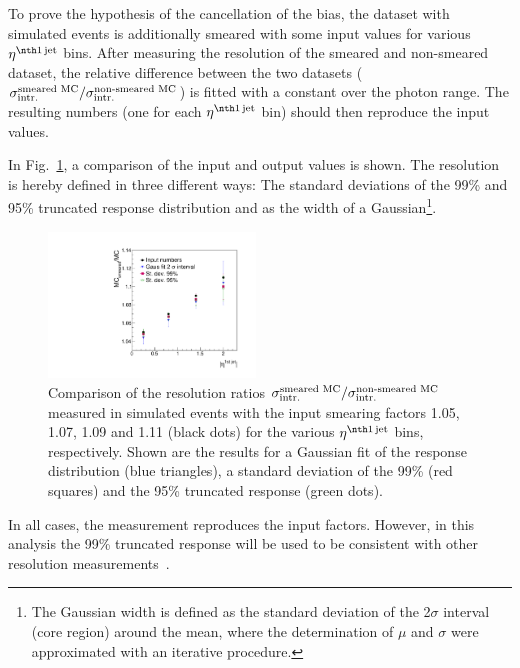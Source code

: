 
To prove the hypothesis of the cancellation of the bias, the dataset with simulated events is additionally smeared with some input values for various $\etafirstjet$ bins. 
After measuring the resolution of the smeared and non-smeared dataset, the relative difference between the two datasets ($\sigma_\mathrm{intr.}^{\text{smeared MC}}/\sigma_\mathrm{intr.}^{\text{non-smeared MC}}$) is fitted with a constant over the photon \pt range. 
The resulting numbers (one for each $\etafirstjet$ bin) should then reproduce the input values. 

In Fig.~\ref{fig:MCClosureRatio}, a comparison of the input and output values is shown. 
The resolution is hereby defined in three different ways: The standard deviations of the 99\% and 95\% truncated response distribution and as the width of a Gaussian\footnote{The Gaussian width is defined as the standard deviation of the 2$\sigma$ interval (core region) around the mean, where the determination of $\mu$ and $\sigma$ were approximated with an iterative procedure.}.
\begin{figure}[t]
  \centering
    \includegraphics[width=0.49\textwidth]{figures/resolution/methodology/MCClosureRatio.pdf}
     \caption{Comparison of the resolution ratios $\sigma_\mathrm{intr.}^{\text{smeared MC}}/\sigma_\mathrm{intr.}^{\text{non-smeared MC}}$ measured in simulated events with the input smearing factors 1.05, 1.07, 1.09 and 1.11 (black dots) 
              for the various $\etafirstjet$ bins, respectively. 
              Shown are the results for a Gaussian fit of the response distribution (blue triangles), a standard deviation of the 99\% (red squares) and the 95\% truncated response (green dots).}
  \label{fig:MCClosureRatio}
\end{figure}

In all cases, the measurement reproduces the input factors.
However, in this analysis the 99\% truncated response will be used to be consistent with other resolution measurements~\cite{bib:CMS:JERCPaper_2016}.

